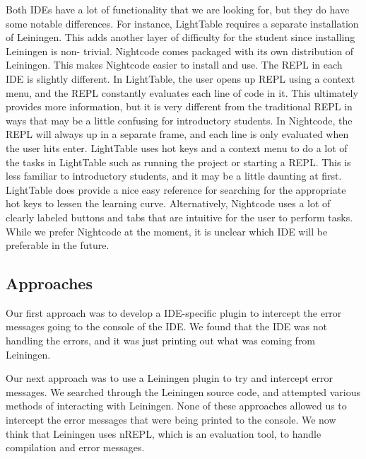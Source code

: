 \documentclass[12pt]{article}
\newcommand{\comment}[1]{{\bf \tt  {#1}}}
\newcommand{\emcomment}[1]{\textcolor{ForestGreen}{\comment{Elena: {#1}}}}
\newcommand{\mmcomment}[1]{\textcolor{magenta}{\comment{Max: {#1}}}}
\begin{document}
Both IDEs have a lot of functionality that we are looking for, but they do have some 
notable differences. For instance,  LightTable requires a separate installation of 
Leiningen. 
This adds another layer of difficulty for the student since installing Leiningen is non-
trivial. Nightcode comes packaged with its own distribution of Leiningen. This makes 
Nightcode easier to install and use. The REPL in each IDE is slightly different. In 
LightTable, the user opens up REPL
using a context menu, and the REPL constantly evaluates each line of code in it. This 
ultimately provides more information, but it is very different from the traditional REPL 
in ways that may be a little confusing for introductory students. In Nightcode, the REPL 
will always up in a separate frame, and each line is only evaluated when the user hits 
enter. LightTable uses hot keys and a context menu to do a lot of the tasks in 
LightTable such as running the project or starting a REPL. This is less
familiar to introductory students, and it may be a little daunting at first. LightTable 
does provide a nice easy reference for searching for the appropriate hot keys to lessen 
the learning curve. Alternatively, Nightcode uses a lot of clearly labeled buttons and 
tabs that are intuitive for the user
to perform tasks. While we prefer Nightcode at the moment, it is unclear which IDE will 
be preferable in the future.

\subsection{Approaches}\label{sec:approach}
Our first approach was to develop a IDE-specific plugin to intercept the error messages 
going to the console of the IDE. We found that the IDE was not handling the errors, and 
it was just printing out what was coming from Leiningen.

Our next approach was to use a Leiningen plugin to try and intercept error messages. We 
searched through the Leiningen source code, and attempted various methods of interacting 
with Leiningen. None of these approaches allowed us to intercept the error messages that 
were being printed to the console. We now think that Leiningen uses nREPL, which is an 
evaluation tool, to handle compilation and error messages.
\end{document}
